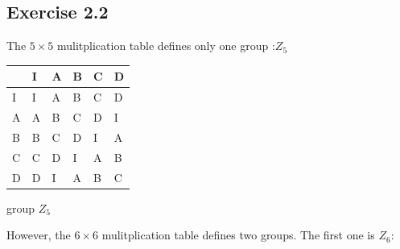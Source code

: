 \documentclass[]{ctexart}
\begin{document}
    \subsection{Exercise 2.2}
    The $5 \times 5$ mulitplication table defines only one group :$Z_5$
    
    \begin{center}
    	\begin{tabular}{l|lllll}
    		\cline{2-6}
    		& \multicolumn{1}{l|}{I} & \multicolumn{1}{l|}{A} & \multicolumn{1}{l|}{B} & \multicolumn{1}{l|}{C} & \multicolumn{1}{l|}{D} \\ \hline
    		\multicolumn{1}{|l|}{I} & I                      & A                      & B                      & C                      & D                      \\ \cline{1-1}
    		\multicolumn{1}{|l|}{A} & A                      & B                      & C                      & D                      & I                      \\ \cline{1-1}
    		\multicolumn{1}{|l|}{B} & B                      & C                      & D                      & I                      & A                      \\ \cline{1-1}
    		\multicolumn{1}{|l|}{C} & C                      & D                      & I                      & A                      & B                      \\ \cline{1-1}
    		\multicolumn{1}{|l|}{D} & D                      & I                      & A                      & B                      & C                      \\ \cline{1-1}
    	\end{tabular}
    \centerline{group $Z_5$}
    \end{center}
    
    However, the $6 \times 6$ mulitplication table defines two groups. 
    The first one is $Z_6$:
    
\end{document}
